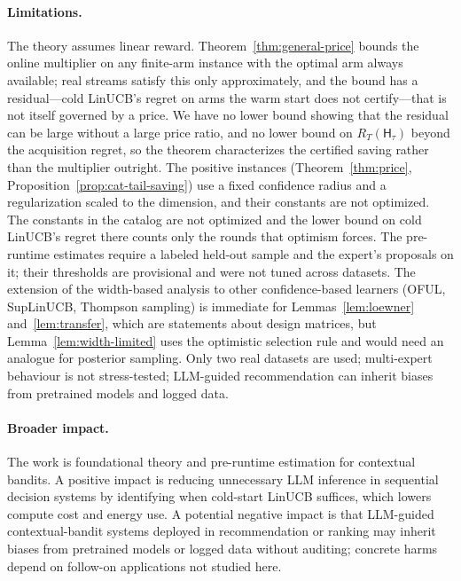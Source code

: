 \documentclass{article}
\theoremstyle{definition}
\theoremstyle{remark}
\theoremstyle{remark}
\newcommand{\Hyb}{\mathsf{H}}
\begin{document}
\paragraph{Limitations.}
The theory assumes linear reward. Theorem~\ref{thm:general-price} bounds the
online multiplier on any finite-arm instance with the optimal arm always
available; real streams satisfy this only approximately, and the bound has a
residual---cold LinUCB's regret on arms the warm start does not certify---that
is not itself governed by a price. We have no lower bound showing that the
residual can be large without a large price ratio, and no lower bound on
$R_T(\Hyb_\tau)$ beyond the acquisition regret, so the theorem characterizes
the certified saving rather than the multiplier outright. The positive
instances (Theorem~\ref{thm:price}, Proposition~\ref{prop:cat-tail-saving})
use a fixed confidence radius and a regularization scaled to the dimension,
and their constants are not optimized.
The constants in the catalog are not optimized and the lower bound on cold
LinUCB's regret there counts only the rounds that optimism forces. The pre-runtime estimates require a labeled held-out sample and the
expert's proposals on it; their thresholds are provisional and were not tuned
across datasets. The extension of the width-based analysis to other
confidence-based learners (OFUL, SupLinUCB, Thompson sampling) is immediate
for Lemmas~\ref{lem:loewner} and~\ref{lem:transfer}, which are statements
about design matrices, but Lemma~\ref{lem:width-limited} uses the optimistic
selection rule and would need an analogue for posterior sampling. Only two
real datasets are used; multi-expert behaviour is not stress-tested;
LLM-guided recommendation can inherit biases from pretrained models and
logged data.

\paragraph{Broader impact.}
The work is foundational theory and pre-runtime estimation for contextual
bandits. A positive impact is reducing unnecessary LLM inference in
sequential decision systems by identifying when cold-start LinUCB suffices,
which lowers compute cost and energy use. A potential negative impact is that
LLM-guided contextual-bandit systems deployed in recommendation or ranking
may inherit biases from pretrained models or logged data without auditing;
concrete harms depend on follow-on applications not studied here.



\end{document}
